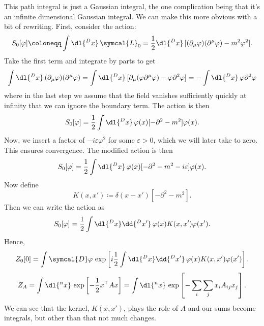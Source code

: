 \documentclass[fleqn]{NotesClass}
\newcommand{\dalembertian}{\partial^2}
\newcommand{\lagrangianDensity}{\symcal{L}}
\newcommand{\trans}{{\top}}
\newcommand{\DL}[1]{\symcal{D}#1}
\begin{document}
    This path integral is just a Gaussian integral, the one complication being that it's an infinite dimensional Gaussian integral.
    We can make this more obvious with a bit of rewriting.
    First, consider the action:
    \begin{align}
        S_0[\varphi] \coloneqq \int \dl{^Dx} \, \lagrangianDensity_0 = \frac{1}{2} \dl{^Dx} \, [(\partial_\mu\varphi)(\partial^\mu\varphi) - m^2\varphi^2].
    \end{align}
    Take the first term and integrate by parts to get
    \begin{equation}
        \int \dl{^Dx} \, (\partial_\mu \varphi)(\partial^\mu \varphi) = \int \dl{^Dx} \, [ \partial_\mu(\varphi\partial^\mu \varphi) - \varphi\dalembertian\varphi] = -\int \dl{^Dx} \, \varphi\dalembertian\varphi
    \end{equation}
    where in the last step we assume that the field vanishes sufficiently quickly at infinity that we can ignore the boundary term.
    The action is then
    \begin{equation}
        S_0[\varphi] = \frac{1}{2} \int \dl{^Dx} \, \varphi(x) [-\dalembertian - m^2] \varphi(x).
    \end{equation}
    Now, we insert a factor of \(-i\varepsilon \varphi^2\) for some \(\varepsilon > 0\), which we will later take to zero.
    This ensures convergence.
    The modified action is then
    \begin{equation}
        S_0[\varphi] = \frac{1}{2} \int \dl{^Dx} \, \varphi(x) [-\dalembertian - m^2 - i\varepsilon] \varphi(x).
    \end{equation}
    Now define
    \begin{equation}
        K(x, x') \coloneqq \delta(x - x')[-\dalembertian - m^2].
    \end{equation}
    Then we can write the action as
    \begin{equation}
        S_0[\varphi] = \frac{1}{2} \int \dl{^Dx} \dd{^Dx'} \, \varphi(x) K(x, x') \varphi(x').
    \end{equation}
    Hence,
    \begin{equation}
        Z_0[0] = \int \DL{\varphi} \, \exp\left[ i\frac{1}{2} \int \dl{^Dx} \dd{^Dx'} \, \varphi(x) K(x, x') \varphi(x') \right].
    \end{equation}
    \begin{equation}
        Z_A = \int \dl{^nx} \, \exp\left[ -\frac{1}{2}x^\trans A x \right] = \int \dl{^nx} \, \exp\left[ -\sum_{i}\sum_{j} x_iA_{ij}x_j \right].
    \end{equation}
    We can see that the kernel, \(K(x, x')\), plays the role of \(A\) and our sums become integrals, but other than that not much changes.
    
\end{document}
